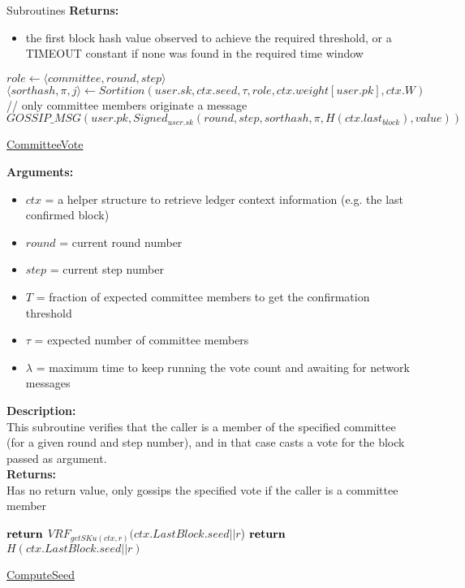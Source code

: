 \documentclass[10pt,a4paper]{article}
\begin{document}
\begin{section}{Subroutines}
\noindent \textbf{Returns:}
\begin{itemize}
    \item the first block hash value observed to achieve the required threshold, or a TIMEOUT constant if none was found in the
    required time window
  \end{itemize}

\begin{algorithm}[H]
    \begin{algorithmic}[H]
    \State $role \gets \langle {committee},round,step\rangle$
    \State $\langle sorthash,\pi,j\rangle \gets Sortition(user.sk,ctx.seed,\tau ,role,ctx.weight[user.pk],ctx.W)$
    // only committee members originate a message
        \State $GOSSIP\_MSG(user.pk, Signed_{user.sk} (round,step,sorthash,\pi,H(ctx.last_{block}),value))$
    \EndIf
    \EndFunction
    \end{algorithmic}
    \caption{\underline{CommitteeVote}}
\end{algorithm}

\noindent \textbf{Arguments:}
\begin{itemize}
    \item $ctx$ = a helper structure to retrieve ledger context information (e.g. the last confirmed block)
    \item $round$ = current round number
    \item $step$ = current step number
    \item $T$ = fraction of expected committee members to get the confirmation threshold
    \item $\tau$ = expected number of committee members
    \item $\lambda$ = maximum time to keep running the vote count and awaiting for network messages
  \end{itemize}

\noindent \textbf{Description:}\\
This subroutine verifies that the caller is a member of the specified committee (for a given round and step number), 
and in that case casts a vote for the block passed as argument.\\

\noindent \textbf{Returns:}\\
Has no return value, only gossips the specified vote if the caller is a committee member


\begin{algorithm}[H]
    \begin{algorithmic}[H]
            \State $\Return$ $VRF_{getSKu(ctx, r)}(ctx.LastBlock.seed||r$)
        \Else
            \State $\Return$ $H(ctx.LastBlock.seed||r)$
        \EndIf
    \EndFunction
    \end{algorithmic}
    \caption{\underline{ComputeSeed}}
\end{algorithm}



\end{section}
\end{document}
